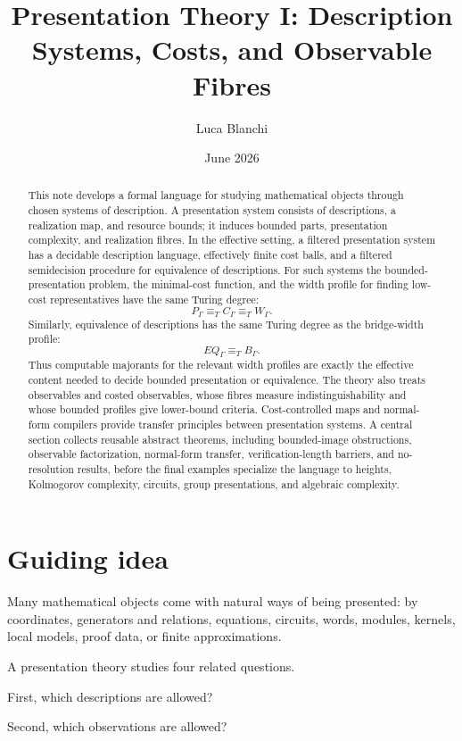 \documentclass[11pt]{article}
\title{Presentation Theory I: Description Systems, Costs, and Observable Fibres}
\author{Luca Blanchi}
\date{June 2026}
\begin{document}
\maketitle

\begin{abstract}
This note develops a formal language for studying mathematical objects through chosen systems of description. A presentation system consists of descriptions, a realization map, and resource bounds; it induces bounded parts, presentation complexity, and realization fibres. In the effective setting, a filtered presentation system has a decidable description language, effectively finite cost balls, and a filtered semidecision procedure for equivalence of descriptions. For such systems the bounded-presentation problem, the minimal-cost function, and the width profile for finding low-cost representatives have the same Turing degree:
\[
P_\Gamma\equiv_T C_\Gamma\equiv_T W_\Gamma.
\]
Similarly, equivalence of descriptions has the same Turing degree as the bridge-width profile:
\[
EQ_\Gamma\equiv_T B_\Gamma.
\]
Thus computable majorants for the relevant width profiles are exactly the effective content needed to decide bounded presentation or equivalence. The theory also treats observables and costed observables, whose fibres measure indistinguishability and whose bounded profiles give lower-bound criteria. Cost-controlled maps and normal-form compilers provide transfer principles between presentation systems. A central section collects reusable abstract theorems, including bounded-image obstructions, observable factorization, normal-form transfer, verification-length barriers, and no-resolution results, before the final examples specialize the language to heights, Kolmogorov complexity, circuits, group presentations, and algebraic complexity.
\end{abstract}

\section{Guiding idea}

Many mathematical objects come with natural ways of being presented: by coordinates, generators and relations, equations, circuits, words, modules, kernels, local models, proof data, or finite approximations.

A presentation theory studies four related questions.

First, which descriptions are allowed?

Second, which observations are allowed?
\end{document}
